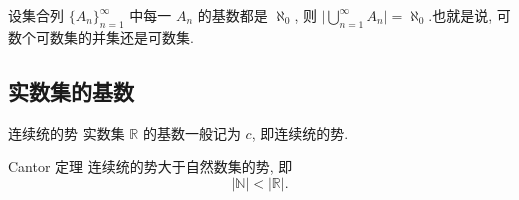 \documentclass[cn,toc=twocol]{elegantbook}
\newcommand{\R}{\mathbb{R}}
\newcommand{\N}{\mathbb{N}}
\begin{document}
\begin{theorem}
	设集合列 $\{A_n\}_{n=1}^{\infty}$ 中每一 $A_n$ 的基数都是 $\aleph_0$, 则 $\lvert \bigcup_{n=1}^\infty A_n \rvert=\aleph_0 $.也就是说, 可数个可数集的并集还是可数集.
\end{theorem}



\subsection{实数集的基数}
\begin{definition}{连续统的势}
	实数集 $\R$ 的基数一般记为 $c$, 即连续统的势.
\end{definition}

\begin{theorem}{Cantor 定理}
连续统的势大于自然数集的势, 即
\[
\lvert \N \rvert < \lvert \R \rvert.
\]
\end{theorem}
\end{document}
